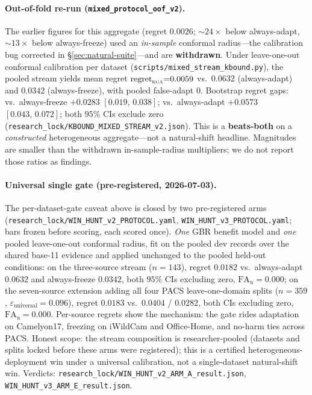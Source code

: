\documentclass[conference]{IEEEtran}
\theoremstyle{plain}
\theoremstyle{definition}
\begin{document}
\paragraph{Out-of-fold re-run (\texttt{mixed\_protocol\_oof\_v2}).}
The earlier figures for this aggregate (regret $0.0026$; ${\sim}24\times$ below always-adapt,
${\sim}13\times$ below always-freeze) used an \emph{in-sample} conformal radius---the calibration bug
corrected in \S\ref{sec:natural-suite}---and are \textbf{withdrawn}. Under leave-one-out conformal
calibration per dataset (\texttt{scripts/mixed\_stream\_kbound.py}), the pooled stream yields mean
regret $\mathrm{regret}_{\textsc{kga}}{=}0.0059$ vs.\ $0.0632$ (always-adapt) and $0.0342$
(always-freeze), with pooled false-adapt $0$. Bootstrap regret gaps: vs.\ always-freeze
$+0.0283$ $[0.019,\,0.038]$; vs.\ always-adapt $+0.0573$ $[0.043,\,0.072]$; both $95\%$ CIs exclude
zero (\texttt{research\_lock/KBOUND\_MIXED\_STREAM\_v2.json}). This is a \textbf{beats-both} on a
\emph{constructed} heterogeneous aggregate---not a natural-shift headline. Magnitudes are smaller
than the withdrawn in-sample-radius multipliers; we do not report those ratios as findings.

\paragraph{Universal single gate (pre-registered, 2026-07-03).} The per-dataset-gate caveat above
is closed by two pre-registered arms (\texttt{research\_lock/WIN\_HUNT\_v2\_PROTOCOL.yaml},
\texttt{WIN\_HUNT\_v3\_PROTOCOL.yaml}; bars frozen before scoring, each scored once). \emph{One}
GBR benefit model and \emph{one} pooled leave-one-out conformal radius, fit on the pooled dev
records over the shared base-11 evidence and applied unchanged to the pooled held-out conditions:
on the three-source stream ($n{=}143$), regret $0.0182$ vs.\ always-adapt $0.0632$ and
always-freeze $0.0342$, both $95\%$ CIs excluding zero, $\mathrm{FA}_{\mathrm u}{=}0.000$; on the
seven-source extension adding all four PACS leave-one-domain splits ($n{=}359$,
$\varepsilon_{\mathrm{universal}}{=}0.096$), regret $0.0183$ vs.\ $0.0404$ / $0.0282$, both CIs
excluding zero, $\mathrm{FA}_{\mathrm u}{=}0.000$. Per-source regrets show the mechanism: the gate
rides adaptation on Camelyon17, freezing on iWildCam and Office-Home, and no-harm ties across
PACS. Honest scope: the stream composition is researcher-pooled (datasets and splits locked
before these arms were registered); this is a certified heterogeneous-deployment win under a
universal calibration, not a single-dataset natural-shift win. Verdicts:
\texttt{research\_lock/WIN\_HUNT\_v2\_ARM\_A\_result.json},
\texttt{WIN\_HUNT\_v3\_ARM\_E\_result.json}.
\end{document}
